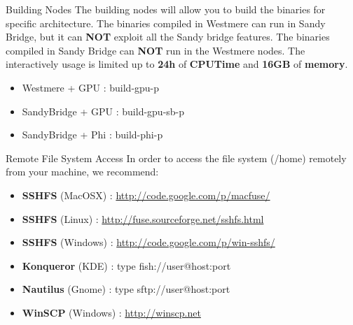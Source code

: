 \documentclass[final,t]{beamer}
\begin{document}
\begin{frame}[fragile]{}
\begin{columns}[t]
\begin{column}{.32\linewidth}
      \begin{block}{Building Nodes}
      The building nodes will allow you to build the binaries for specific architecture. The binaries compiled in Westmere can run in Sandy Bridge, but it can \textbf{NOT} exploit all the Sandy bridge features. The binaries compiled in Sandy Bridge can \textbf{NOT} run in the Westmere nodes. The interactively usage is limited up to \textbf{24h} of \textbf{CPUTime} and \textbf{16GB} of \textbf{memory}.
        \begin{itemize}
        \item Westmere + GPU : build-gpu-p
        \item SandyBridge + GPU : build-gpu-sb-p
        \item SandyBridge + Phi : build-phi-p
        \end{itemize}
      \end{block}
      


      \begin{block}{Remote File System Access}
       In order to access the file system (/home) remotely from your machine, we recommend:
        \begin{itemize}
        \item \textbf{SSHFS} (MacOSX) : \url{http://code.google.com/p/macfuse/}
        \item \textbf{SSHFS} (Linux) : \url{http://fuse.sourceforge.net/sshfs.html}
        \item \textbf{SSHFS} (Windows) : \url{http://code.google.com/p/win-sshfs/}
        \item \textbf{Konqueror} (KDE) : type fish://user@host:port
        \item \textbf{Nautilus} (Gnome) : type sftp://user@host:port
        \item \textbf{WinSCP} (Windows) : \url{http://winscp.net}
        \end{itemize}
      \end{block}
 

\end{column}
\end{columns}
\end{frame}
\end{document}

